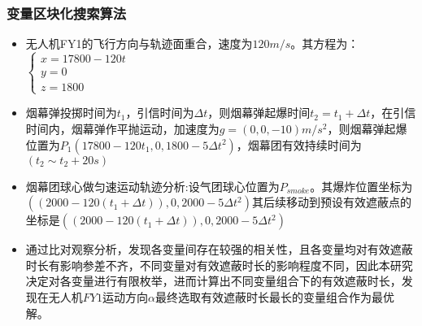 \documentclass{article}
\begin{document}
\subsubsection{变量区块化搜索算法}
\begin{itemize}
    \item 无人机FY1的飞行方向与轨迹面重合，速度为$120m/s$。其方程为：$\begin{cases}
        x = 17800 - 120t \\
        y = 0 \\
        z = 1800
    \end{cases}$
    \item 烟幕弹投掷时间为$t_1$，引信时间为$\Delta t$，则烟幕弹起爆时间$t_2 = t_1 + \Delta t$，在引信时间内，烟幕弹作平抛运动，加速度为$g = (0,0,-10)$$m/s^2$，则烟幕弹起爆位置为$P_1(17800 - 120t_1,0,1800 - 5\Delta t^2)$，烟幕团有效持续时间为$(t_2 \sim t_2 + 20s)$
    \item 烟幕团球心做匀速运动轨迹分析:设气团球心位置为$P_{smoke}$。其爆炸位置坐标为$((2000-120(t_1 + \Delta t)),0,2000-5 \Delta t^2)$其后续移动到预设有效遮蔽点的坐标是$((2000-120(t_1 + \Delta t)),0,2000-5 \Delta t^2)$
    \item 通过比对观察分析，发现各变量间存在较强的相关性，且各变量均对有效遮蔽时长有影响参差不齐，不同变量对有效遮蔽时长的影响程度不同，因此本研究决定对各变量进行有限枚举，进而计算出不同变量组合下的有效遮蔽时长，发现在$无人机FY1运动方向\alpha$最终选取有效遮蔽时长最长的变量组合作为最优解。
\end{itemize}
\end{document}
